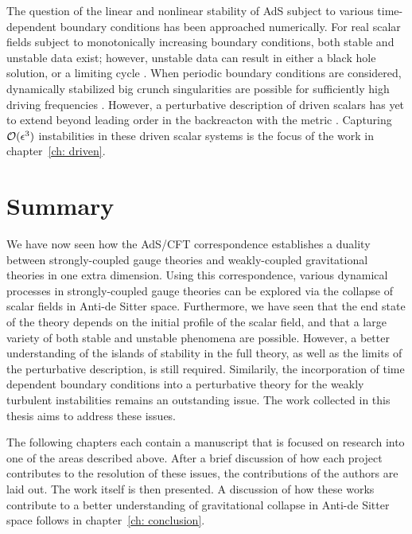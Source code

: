\documentclass[../PhD.tex]{subfiles}
\begin{document}
The question of the linear and nonlinear stability of AdS subject to various time-dependent boundary conditions has been approached numerically. For real scalar fields subject to monotonically increasing boundary conditions, both stable and unstable data exist; however, unstable data can result in either a black hole solution, or a limiting cycle \cite{1612.07701}. When periodic boundary conditions are considered, dynamically stabilized big crunch singularities are possible for sufficiently high driving frequencies \cite{1206.2902}. However, a perturbative description of driven scalars has yet to extend beyond leading order in the backreacton with the metric \cite{1308.2132}. Capturing $\mathcal O(\epsilon^3)$ instabilities in these driven scalar systems is the focus of the work in chapter~\ref{ch: driven}. 



\section{Summary}
\label{sec: summary}

We have now seen how the AdS/CFT correspondence establishes a duality between strongly-coupled gauge theories and weakly-coupled gravitational theories in one extra dimension. Using this correspondence, various dynamical processes in strongly-coupled gauge theories can be explored via the collapse of scalar fields in Anti-de Sitter space. Furthermore, we have seen that the end state of the theory depends on the initial profile of the scalar field, and that a large variety of both stable and unstable phenomena are possible. However, a better understanding of the islands of stability in the full theory, as well as the limits of the perturbative description, is still required. Similarily, the incorporation of time dependent boundary conditions into a perturbative theory for the weakly turbulent instabilities remains an outstanding issue. The work collected in this thesis aims to address these issues.

The following chapters each contain a manuscript that is focused on research into one of the areas described above. After a brief discussion of how each project contributes to the resolution of these issues, the contributions of the authors are laid out. The work itself is then presented. A discussion of how these works contribute to a better understanding of gravitational collapse in Anti-de Sitter space follows in chapter~\ref{ch: conclusion}.

\end{document}
